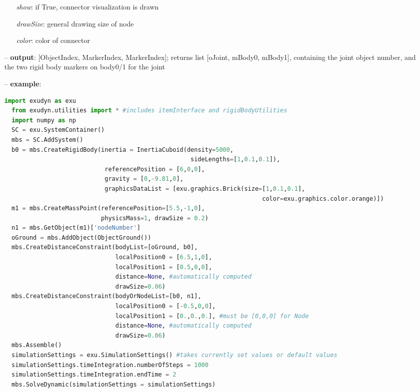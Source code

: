 \begin{itemize}[leftmargin=0.7cm]
\begin{itemize}[leftmargin=1.2cm]
\item[]{\it show}: if True, connector visualization is drawn
\item[]{\it drawSize}: general drawing size of node
\item[]{\it color}: color of connector
\end{itemize}
\item[--]
{\bf output}: [ObjectIndex, MarkerIndex, MarkerIndex]; returns list [oJoint, mBody0, mBody1], containing the joint object number, and the two rigid body markers on body0/1 for the joint
\item[--]
{\bf example}: \vspace{-12pt}\ei\begin{lstlisting}[language=Python, xleftmargin=36pt]
  import exudyn as exu
  from exudyn.utilities import * #includes itemInterface and rigidBodyUtilities
  import numpy as np
  SC = exu.SystemContainer()
  mbs = SC.AddSystem()
  b0 = mbs.CreateRigidBody(inertia = InertiaCuboid(density=5000,
                                                    sideLengths=[1,0.1,0.1]),
                            referencePosition = [6,0,0],
                            gravity = [0,-9.81,0],
                            graphicsDataList = [exu.graphics.Brick(size=[1,0.1,0.1],
                                                                        color=exu.graphics.color.orange)])
  m1 = mbs.CreateMassPoint(referencePosition=[5.5,-1,0],
                           physicsMass=1, drawSize = 0.2)
  n1 = mbs.GetObject(m1)['nodeNumber']
  oGround = mbs.AddObject(ObjectGround())
  mbs.CreateDistanceConstraint(bodyList=[oGround, b0],
                               localPosition0 = [6.5,1,0],
                               localPosition1 = [0.5,0,0],
                               distance=None, #automatically computed
                               drawSize=0.06)
  mbs.CreateDistanceConstraint(bodyOrNodeList=[b0, n1],
                               localPosition0 = [-0.5,0,0],
                               localPosition1 = [0.,0.,0.], #must be [0,0,0] for Node
                               distance=None, #automatically computed
                               drawSize=0.06)
  mbs.Assemble()
  simulationSettings = exu.SimulationSettings() #takes currently set values or default values
  simulationSettings.timeIntegration.numberOfSteps = 1000
  simulationSettings.timeIntegration.endTime = 2
  mbs.SolveDynamic(simulationSettings = simulationSettings)
\end{lstlisting}\vspace{-24pt}\bi\item[]\vspace{-24pt}\vspace{12pt}\end{itemize}
%

